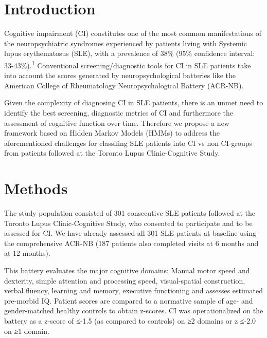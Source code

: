 \documentclass[
]{article}
\author{}
\date{\vspace{-2.5em}}
\begin{document}
{
\setcounter{tocdepth}{2}
\tableofcontents
}
\hypertarget{introduction}{%
\section{Introduction}\label{introduction}}

Cognitive impairment (CI) constitutes one of the most common manifestations of the neuropsychiatric syndromes experienced by patients living with Systemic lupus erythematosus (SLE), with a prevalence of 38\% (95\% confidence interval: 33-43\%).\textsuperscript{1} Conventional screening/diagnostic tools for CI in SLE patients take into account the scores generated by neuropsychological batteries like the American College of Rheumatology Neuropsychological Battery (ACR-NB).

Given the complexity of diagnosing CI in SLE patients, there is an unmet need to identify the best screening, diagnostic metrics of CI and furthermore the assessment of cognitive function over time. Therefore we propose a new framework based on Hidden Markov Models (HMMs) to address the aforementioned challenges for classifing SLE patients into CI vs non CI-groups from patients followed at the Toronto Lupus Clinic-Cognitive Study.

\hypertarget{methods}{%
\section{Methods}\label{methods}}

The study population consisted of 301 consecutive SLE patients followed at the Toronto Lupus Clinic-Cognitive Study, who consented to participate and to be assessed for CI. We have already assessed all 301 SLE patients at baseline using the comprehensive ACR-NB (187 patients also completed visits at 6 months and at 12 months).

This battery evaluates the major cognitive domains: Manual motor speed and dexterity, simple attention and processing speed, visual-spatial construction, verbal fluency, learning and memory, executive functioning and assesses estimated pre-morbid IQ. Patient scores are compared to a normative sample of age- and gender-matched healthy controls to obtain z-scores. CI was operationalized on the battery as a z-score of ≤-1.5 (as compared to controls) on ≥2 domains or z ≤-2.0 on ≥1 domain.
\end{document}
